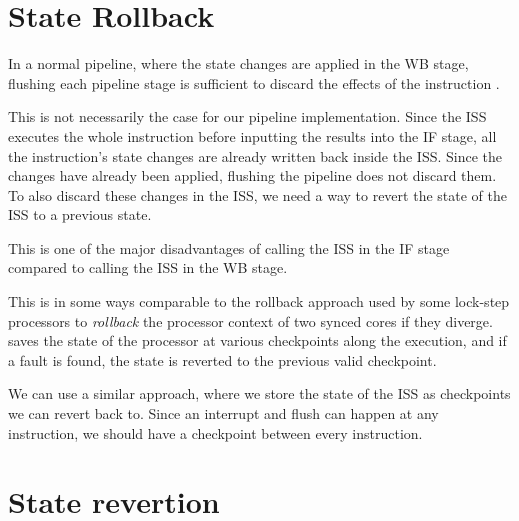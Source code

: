 \section{State Rollback}

In a normal pipeline, where the state changes are applied in the WB stage, flushing each pipeline stage is sufficient to discard the effects of the instruction \cite[Ch. 4]{pattersonComputerOrganizationDesign2021}.

This is not necessarily the case for our pipeline implementation. Since the ISS executes the whole instruction before inputting the results into the IF stage, all the instruction's state changes are already written back inside the ISS. Since the changes have already been applied, flushing the pipeline does not discard them. To also discard these changes in the ISS, we need a way to revert the state of the ISS to a previous state.

This is one of the major disadvantages of calling the ISS in the IF stage compared to calling the ISS in the WB stage.



This is in some ways comparable to the rollback approach used by some lock-step processors \cite{marquesLockVHeterogeneousFault2021, liDuckCoreFaultTolerantProcessor2021, nikiemaDesignLowComplexity2023} to \textit{rollback} the processor context of two synced cores if they diverge. \textcite{marquesLockVHeterogeneousFault2021} saves the state of the processor at various \glspl{checkpoint} along the execution, and if a fault is found, the state is reverted to the previous valid checkpoint.

We can use a similar approach, where we store the state of the ISS as checkpoints we can revert back to. Since an interrupt and flush can happen at any instruction, we should have a checkpoint between every instruction.










\section{State revertion}

